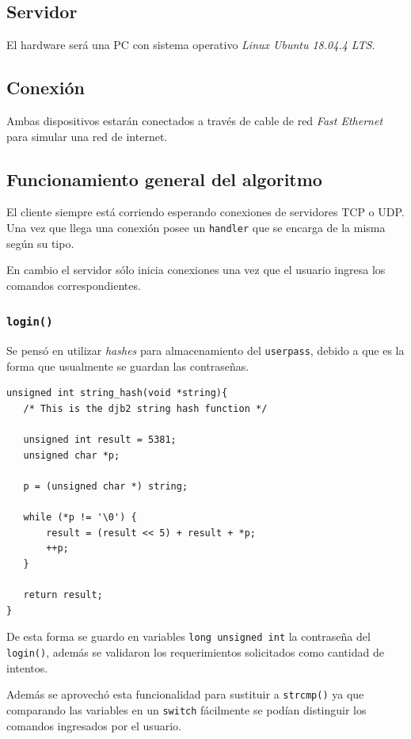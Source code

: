 \documentclass[a4paper]{article}
\begin{document}
\subsection{Servidor}
El hardware será una PC con sistema operativo \textit{Linux Ubuntu 18.04.4 LTS}.

\subsection{Conexión}
Ambas dispositivos estarán conectados a través de cable de red \textit{Fast Ethernet} para simular una red de internet.

\subsection{Funcionamiento general del algoritmo}
El cliente siempre está corriendo esperando conexiones de servidores TCP o UDP. Una vez que llega una conexión posee un \texttt{handler} que se encarga de la misma según su tipo.

En cambio el servidor sólo inicia conexiones una vez que el usuario ingresa los comandos correspondientes.

\subsubsection{\texttt{login()}}
Se pensó en utilizar \textit{hashes} para almacenamiento del \texttt{userpass}, debido a que es la forma que usualmente se guardan las contraseñas.

\begin{lstlisting}
unsigned int string_hash(void *string){
   /* This is the djb2 string hash function */

   unsigned int result = 5381;
   unsigned char *p;

   p = (unsigned char *) string;

   while (*p != '\0') {
	   result = (result << 5) + result + *p;
	   ++p;
   }

   return result;
}
\end{lstlisting}

De esta forma se guardo en variables \texttt{long unsigned int} la contraseña del \texttt{login()}, además se validaron los requerimientos solicitados como cantidad de intentos.

Además se aprovechó esta funcionalidad para sustituir a \texttt{strcmp()} ya que comparando las variables en un \texttt{switch} fácilmente se podían distinguir los comandos ingresados por el usuario.
\end{document}
